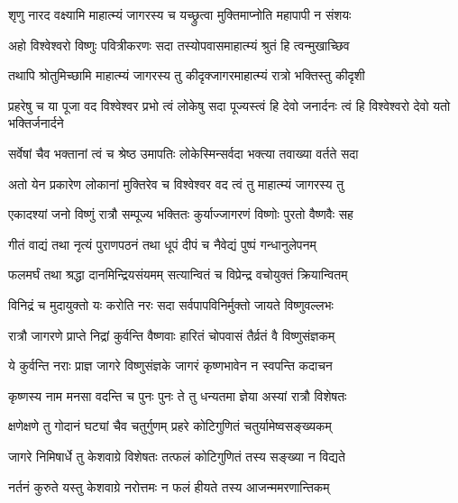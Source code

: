 
\twolineshloka
{शृणु नारद वक्ष्यामि माहात्म्यं जागरस्य च}
{यच्छ्रुत्वा मुक्तिमाप्नोति महापापी न संशयः}%


\twolineshloka
{अहो विश्वेश्वरो विष्णुः पवित्रीकरणः सदा}
{तस्योपवासमाहात्म्यं श्रुतं हि त्वन्मुखाच्छिव}%

\twolineshloka
{तथापि श्रोतुमिच्छामि माहात्म्यं जागरस्य तु }
{कीदृक्जागरमाहात्म्यं रात्रो भक्तिस्तु  कीदृशी}%

\threelineshloka
{प्रहरेषु च या पूजा वद विश्वेश्वर प्रभो}
{त्वं लोकेषु सदा पूज्यस्त्वं हि देवो जनार्दनः}
{त्वं हि विश्वेश्वरो देवो यतो भक्तिर्जनार्दने}%

\twolineshloka
{सर्वेषां चैव भक्तानां त्वं च श्रेष्ठ उमापतिः}
{लोकेस्मिन्सर्वदा भक्त्या तवाख्या वर्तते सदा}%

\twolineshloka
{अतो येन प्रकारेण लोकानां मुक्तिरेव च}
{विश्वेश्वर वद त्वं तु माहात्म्यं जागरस्य तु}%


\twolineshloka
{एकादश्यां जनो विष्णुं रात्रौ सम्पूज्य भक्तितः}
{कुर्याज्जागरणं विष्णोः पुरतो वैष्णवैः सह}%

\twolineshloka
{गीतं वाद्यं तथा नृत्यं पुराणपठनं तथा}
{धूपं दीपं च नैवेद्यं पुष्पं गन्धानुलेपनम्}%

\twolineshloka
{फलमर्घं तथा श्रद्धा दानमिन्द्रियसंयमम्}
{सत्यान्वितं च विप्रेन्द्र वचोयुक्तं क्रियान्वितम्}%

\twolineshloka
{विनिद्रं च मुदायुक्तो यः करोति नरः सदा}
{सर्वपापविनिर्मुक्तो जायते विष्णुवल्लभः}%

\twolineshloka
{रात्रौ जागरणे प्राप्ते निद्रां कुर्वन्ति वैष्णवाः}
{हारितं चोपवासं तैर्व्रतं वै विष्णुसंज्ञकम्}%

\twolineshloka
{ये कुर्वन्ति नराः प्राज्ञ जागरे विष्णुसंज्ञके}
{जागरं कृष्णभावेन न स्वपन्ति कदाचन}%

\twolineshloka
{कृष्णस्य नाम मनसा वदन्ति च पुनः पुनः}
{ते तु धन्यतमा ज्ञेया अस्यां रात्रौ विशेषतः}%

\twolineshloka
{क्षणेक्षणे तु गोदानं घट्यां चैव चतुर्गुणम्}
{प्रहरे कोटिगुणितं चतुर्यामेष्वसङ्ख्यकम्}%

\twolineshloka
{जागरे निमिषार्धे तु केशवाग्रे विशेषतः}
{तत्फलं कोटिगुणितं तस्य सङ्ख्या न विद्यते}%

\twolineshloka
{नर्तनं कुरुते यस्तु केशवाग्रे नरोत्तमः}
{न फलं हीयते तस्य आजन्ममरणान्तिकम्}%

